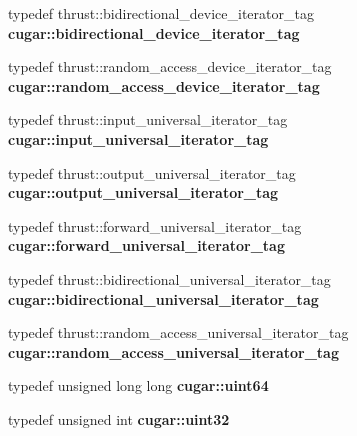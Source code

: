 \begin{DoxyCompactItemize}
\mbox{\label{group___basic_gabb0f6a24f872c671965d196b77cd2cec}} 
typedef thrust\+::bidirectional\+\_\+device\+\_\+iterator\+\_\+tag {\bfseries cugar\+::bidirectional\+\_\+device\+\_\+iterator\+\_\+tag}
\item 
\mbox{\label{group___basic_ga5cbab61a199d4f1bdf3f7c5c786bca57}} 
typedef thrust\+::random\+\_\+access\+\_\+device\+\_\+iterator\+\_\+tag {\bfseries cugar\+::random\+\_\+access\+\_\+device\+\_\+iterator\+\_\+tag}
\item 
\mbox{\label{group___basic_ga23652029feba97ff212c5ab4528ecd78}} 
typedef thrust\+::input\+\_\+universal\+\_\+iterator\+\_\+tag {\bfseries cugar\+::input\+\_\+universal\+\_\+iterator\+\_\+tag}
\item 
\mbox{\label{group___basic_ga00a90c38f6c6eeea3c9d15950ec7e3af}} 
typedef thrust\+::output\+\_\+universal\+\_\+iterator\+\_\+tag {\bfseries cugar\+::output\+\_\+universal\+\_\+iterator\+\_\+tag}
\item 
\mbox{\label{group___basic_gaeb04f987ee0c18d0aad4d61c0c5de3d2}} 
typedef thrust\+::forward\+\_\+universal\+\_\+iterator\+\_\+tag {\bfseries cugar\+::forward\+\_\+universal\+\_\+iterator\+\_\+tag}
\item 
\mbox{\label{group___basic_ga9411dc6934cca010bf45655f8c657919}} 
typedef thrust\+::bidirectional\+\_\+universal\+\_\+iterator\+\_\+tag {\bfseries cugar\+::bidirectional\+\_\+universal\+\_\+iterator\+\_\+tag}
\item 
\mbox{\label{group___basic_gaddcb803d48180ad73a58446b9a449e16}} 
typedef thrust\+::random\+\_\+access\+\_\+universal\+\_\+iterator\+\_\+tag {\bfseries cugar\+::random\+\_\+access\+\_\+universal\+\_\+iterator\+\_\+tag}
\item 
\mbox{\label{group___basic_ga50c3882a0db80ed1244b035039863e2a}} 
typedef unsigned long long {\bfseries cugar\+::uint64}
\item 
\mbox{\label{group___basic_ga71fc4edef5044aa3e7668d4294df14df}} 
typedef unsigned int {\bfseries cugar\+::uint32}
\item 

\end{DoxyCompactItemize}
